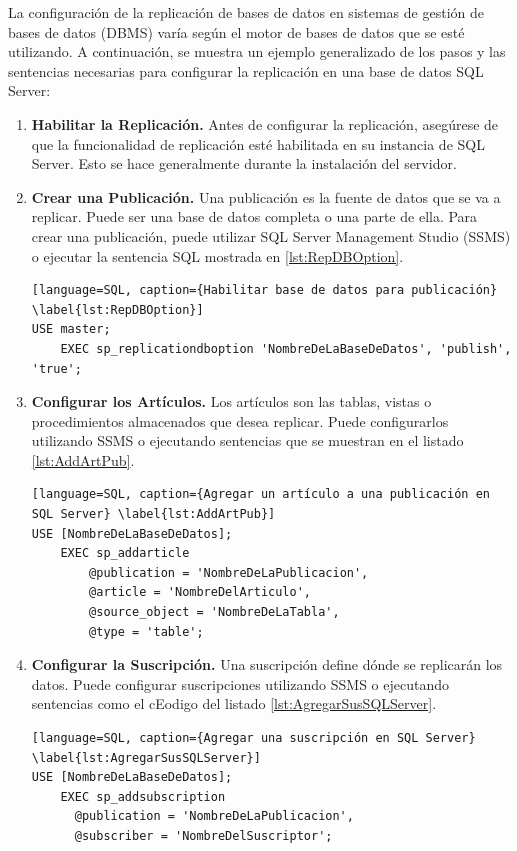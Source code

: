 La configuración de la replicación de bases de datos en sistemas de gestión de bases de datos (DBMS) varía según el motor de bases de datos que se esté utilizando. A continuación, se muestra un ejemplo generalizado de los pasos y las sentencias necesarias para configurar la replicación en una base de datos SQL Server:

\begin{enumerate}
	\item \textbf{Habilitar la Replicación.} Antes de configurar la replicación, asegúrese de que la funcionalidad de replicación esté habilitada en su instancia de SQL Server. Esto se hace generalmente durante la instalación del servidor.
	\item \textbf{Crear una Publicación.} Una publicación es la fuente de datos que se va a replicar. Puede ser una base de datos completa o una parte de ella. Para crear una publicación, puede utilizar SQL Server Management Studio (SSMS) o ejecutar la sentencia SQL mostrada en \ref{lst:RepDBOption}.
	
	\begin{lstlisting}[language=SQL, caption={Habilitar base de datos para publicación} \label{lst:RepDBOption}]
USE master;
	EXEC sp_replicationdboption 'NombreDeLaBaseDeDatos', 'publish', 'true';
	\end{lstlisting}
	
	\item \textbf{Configurar los Artículos.} Los artículos son las tablas, vistas o procedimientos almacenados que desea replicar. Puede configurarlos utilizando SSMS o ejecutando sentencias que se muestran en el listado \ref{lst:AddArtPub}.
	
	\begin{lstlisting}[language=SQL, caption={Agregar un artículo a una publicación en SQL Server} \label{lst:AddArtPub}]
USE [NombreDeLaBaseDeDatos];
	EXEC sp_addarticle 
		@publication = 'NombreDeLaPublicacion', 
		@article = 'NombreDelArticulo', 
		@source_object = 'NombreDeLaTabla', 
		@type = 'table';
	\end{lstlisting}
	
	\item \textbf{Configurar la Suscripción.} Una suscripción define dónde se replicarán los datos. Puede configurar suscripciones utilizando SSMS o ejecutando sentencias como el cEodigo del listado \ref{lst:AgregarSusSQLServer}.
	
	\begin{lstlisting}[language=SQL, caption={Agregar una suscripción en SQL Server} \label{lst:AgregarSusSQLServer}]
USE [NombreDeLaBaseDeDatos];
	EXEC sp_addsubscription 
	  @publication = 'NombreDeLaPublicacion', 
	  @subscriber = 'NombreDelSuscriptor';
	\end{lstlisting}
	

\end{enumerate}
